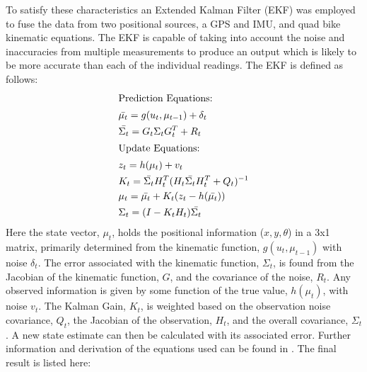\documentclass[main.tex]{subfiles}
\begin{document}
To satisfy these characteristics an Extended Kalman Filter (EKF) was employed to fuse the data from two positional sources, a GPS and IMU, and quad bike kinematic equations. The EKF is capable of taking into account the noise and inaccuracies from multiple measurements to produce an output which is likely to be more accurate than each of the individual readings. The EKF is defined as follows:
\begin{align}
\shortintertext{Prediction Equations:}
&\bar{\mu_t} = g(u_t, \mu_{t-1}) + \delta_t\\
&\bar{\Sigma_t} = G_t\Sigma_tG_t^T + R_t\\
\shortintertext{Update Equations:}
&z_t = h(\mu_t) + v_t\\
&K_t = \bar{\Sigma_t}H_t^T(H_t\bar{\Sigma_t}H_t^T + Q_t)^{-1}\\
&\mu_t = \bar{\mu_t} + K_t(z_t-h(\bar{\mu_t}))\\
&\Sigma_t = (I - K_tH_t)\bar{\Sigma_t}
\end{align}
Here the state vector, $\mu_t$, holds the positional information ($x, y, \theta$) in a 3x1 matrix, primarily determined from the kinematic function, $g(u_t, \mu_{t-1})$ with noise $\delta_t$. The error associated with the kinematic function, $\Sigma_t$, is found from the Jacobian of the kinematic function, $G$, and the covariance of the noise, $R_t$. Any observed information is given by some function of the true value, $h(\mu_t)$, with noise $v_t$. The Kalman Gain, $K_t$, is weighted based on the observation noise covariance, $Q_t$, the Jacobian of the observation, $H_t$, and the overall covariance, $\Sigma_t$. A new state estimate can then be calculated with its associated error. Further information and derivation of the equations used can be found in . The final result is listed here:
\end{document}
